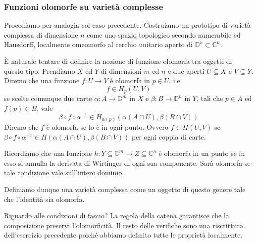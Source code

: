 



\subsubsection*{Funzioni olomorfe su varietà complesse}

Procediamo per analogia col caso precedente.
Costruiamo un prototipo di varietà complessa di dimensione $n$ come uno spazio topologico secondo numerabile ed Hausdorff, localmente omeomorfo al cerchio unitario aperto di $\mathbb D^n\subset\mathbb C^n$.

È naturale tentare di definire la nozione di funzione olomorfa tra oggetti di questo tipo.
Prendiamo $X$ ed $Y$ di dimensioni $m$ ed $n$ e due aperti $U\subseteq X$ e $V\subseteq Y$.
Diremo che una funzione $f\colon U\to V$ è olomorfa in $p\in U$, i.e.
\[ f\in H_p(U,V) \]
se scelte comunque due carte $\alpha\colon A\to\mathbb D^m$ in $X$ e $\beta\colon B\to\mathbb D^n$ in $Y$, tali che $p\in A$ ed $f(p)\in B$, vale
\[ \beta\circ f\circ\alpha^{-1}\in H_{\alpha(p)}(\alpha(A\cap U),\beta(B\cap V)) \]
Diremo che $f$ è olomorfa se lo è in ogni punto.
Ovvero $f\in H(U,V)$ se $\beta\circ f\circ\alpha^{-1}\in H(\alpha(A\cap U),\beta(B\cap V))$ per ogni coppia di carte.

Ricordiamo che una funzione $h\colon Y\subseteq\mathbb C^m\to Z\subseteq\mathbb C^n$ è olomorfa in un punto se in esso si annulla la derivata di Wirtinger di ogni sua componente. Sarà olomorfa se tale condizione vale sull'intero dominio.

Definiamo dunque una varietà complessa come un oggetto di questo genere tale che l'identità sia olomorfa.

Riguardo alle condizioni di fascio?
La regola della catena garantisce che la composizione preservi l'olomorficità.
Il resto delle verifiche sono una riscrittura dell'esercizio precedente poiché abbiamo definito tutte le proprietà localmente.


\hrulefill

